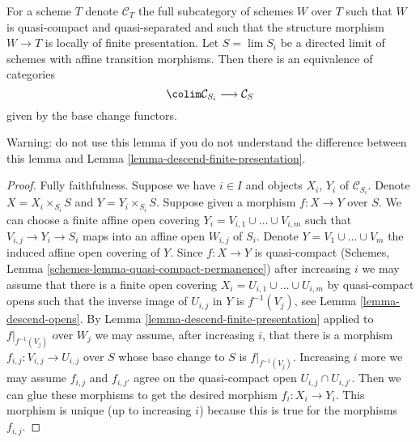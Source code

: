 \begin{lemma}
\label{lemma-descend-finite-presentation-variant}
For a scheme $T$ denote $\mathcal{C}_T$ the full subcategory of
schemes $W$ over $T$ such that $W$ is quasi-compact and quasi-separated
and such that the structure morphism $W \to T$ is
locally of finite presentation.
Let $S = \lim S_i$ be a directed limit of schemes with affine
transition morphisms. Then there is an equivalence
of categories
$$
\colim \mathcal{C}_{S_i} \longrightarrow \mathcal{C}_S
$$
given by the base change functors.
\end{lemma}

\noindent
Warning: do not use this lemma if you do not understand the difference
between this lemma and Lemma \ref{lemma-descend-finite-presentation}.

\begin{proof}
Fully faithfulness. Suppose we have $i \in I$ and objects
$X_i$, $Y_i$ of $\mathcal{C}_{S_i}$. Denote
$X = X_i \times_{S_i} S$ and $Y = Y_i \times_{S_i} S$.
Suppose given a morphism $f : X \to Y$ over $S$.
We can choose a finite affine open covering
$Y_i = V_{i, 1} \cup \ldots \cup V_{i, m}$
such that $V_{i, j} \to Y_i \to S_i$ maps into an affine
open $W_{i, j}$ of $S_i$. Denote $Y = V_1 \cup \ldots \cup V_m$ the
induced affine open covering of $Y$.
Since $f : X \to Y$ is quasi-compact
(Schemes, Lemma \ref{schemes-lemma-quasi-compact-permanence})
after increasing $i$ we may assume that there is a
finite open covering $X_i = U_{i, 1} \cup \ldots \cup U_{i, m}$
by quasi-compact opens such that the inverse image of
$U_{i, j}$ in $Y$ is $f^{-1}(V_j)$, see
Lemma \ref{lemma-descend-opens}.
By Lemma \ref{lemma-descend-finite-presentation}
applied to $f|_{f^{-1}(V_j)}$ over $W_j$ we may assume, after
increasing $i$, that there is a morphism
$f_{i, j} : V_{i, j} \to U_{i, j}$ over $S$ whose base change
to $S$ is $f|_{f^{-1}(V_j)}$.
Increasing $i$ more we may assume $f_{i, j}$ and $f_{i, j'}$
agree on the quasi-compact open $U_{i, j} \cap U_{i, j'}$.
Then we can glue these morphisms to get the
desired morphism $f_i : X_i \to Y_i$.
This morphism is unique (up to increasing $i$)
because this is true for the morphisms $f_{i, j}$.


\end{proof}
